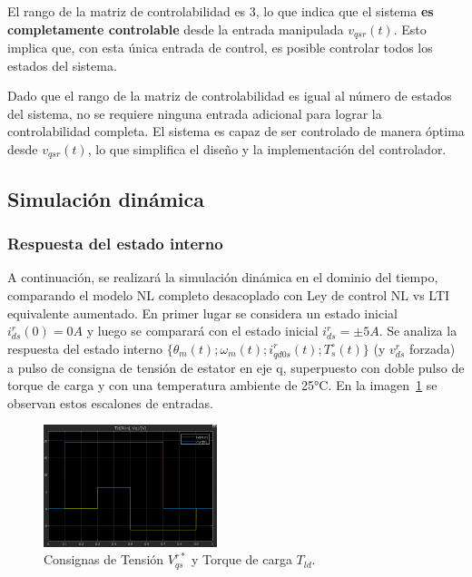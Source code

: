 \documentclass{article}
\begin{document}
El rango de la matriz de controlabilidad es 3, lo que indica que el sistema \textbf{es completamente controlable} desde la entrada manipulada \( v_{qsr}(t) \). Esto implica que, con esta única entrada de control, es posible controlar todos los estados del sistema.

Dado que el rango de la matriz de controlabilidad es igual al número de estados del sistema, no se requiere ninguna entrada adicional para lograr la controlabilidad completa. El sistema es capaz de ser controlado de manera óptima desde \( v_{qsr}(t) \), lo que simplifica el diseño y la implementación del controlador.





\newpage
\subsection{Simulación dinámica}
\subsubsection{Respuesta del estado interno}
\label{sec:respuesta_estado_interno_simulaciónDT}
A continuación, se realizará la simulación dinámica en el dominio del tiempo, comparando el modelo NL completo desacoplado con Ley de control NL vs LTI equivalente aumentado. En primer lugar se considera un estado inicial \(i^r_{ds}(0) = 0A\) y luego se comparará con el estado inicial \(i^r_{ds} = \pm 5A\). 
Se analiza la respuesta del estado interno $\{\theta_m(t);\omega_m(t);i^r_{qd0s}(t);T^\circ_s(t)\}$ (y \(v^r_{ds}\) forzada) a pulso de consigna de tensión de estator en eje q, superpuesto con doble pulso de torque de carga y con una temperatura ambiente de 25°C. En la imagen~\ref{fig:EntradasSimulacionDT} se observan estos escalones de entradas.

\begin{figure}[H]
    \centering
    \includegraphics[width=0.45\textwidth]{Imagenes/EntradasTdVq.png}
    \caption{Consignas de Tensión \(V^{r*}_{qs}\) y Torque de carga \(T_{ld}\).}
    \label{fig:EntradasSimulacionDT}
\end{figure}
\end{document}
